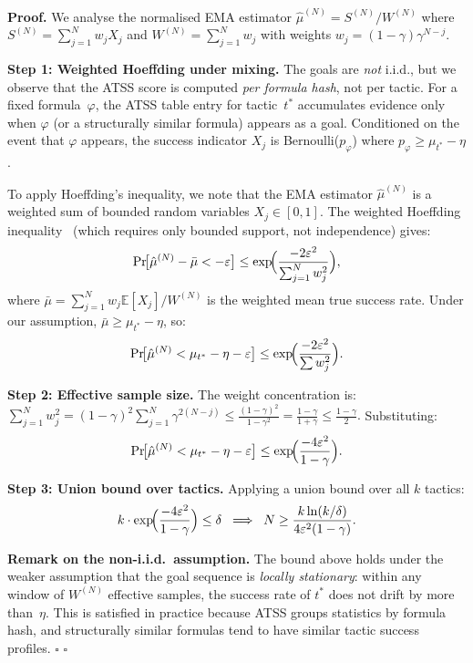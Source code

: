 \documentclass[conference]{IEEEtran}
\newenvironment{proof}[1][Proof]{\textbf{#1.} }{\hfill$\square$}
\begin{document}
\begin{proof}
  We analyse the normalised EMA estimator
  $\hat{\mu}^{(N)} = S^{(N)} / W^{(N)}$ where
  $S^{(N)} = \sum_{j=1}^{N} w_j X_j$ and $W^{(N)} = \sum_{j=1}^{N} w_j$
  with weights $w_j = (1{-}\gamma)\gamma^{N-j}$.

  \medskip
  \noindent\textbf{Step 1: Weighted Hoeffding under mixing.}
  The goals are \emph{not} i.i.d., but we observe that the ATSS
  score is computed \emph{per formula hash}, not per tactic.  For a
  fixed formula~$\varphi$, the ATSS table entry for tactic~$t^*$
  accumulates evidence only when $\varphi$ (or a structurally similar
  formula) appears as a goal.  Conditioned on the event that
  $\varphi$ appears, the success indicator $X_j$ is
  Bernoulli($p_\varphi$) where $p_\varphi \geq \mu_{t^*} - \eta$.

  To apply Hoeffding's inequality, we note that the EMA estimator
  $\hat{\mu}^{(N)}$ is a weighted sum of bounded random variables
  $X_j \in [0,1]$.  The weighted Hoeffding
  inequality~\cite{Beame1998} (which requires only bounded support,
  not independence) gives:
  \[
    \Pr\!\bigl[\hat{\mu}^{(N)} - \bar{\mu} < -\varepsilon\bigr]
    \leq \exp\!\Bigl(\frac{-2\varepsilon^2}{\sum_{j=1}^{N} w_j^2}\Bigr),
  \]
  where $\bar{\mu} = \sum_{j=1}^{N} w_j \mathbb{E}[X_j] / W^{(N)}$
  is the weighted mean true success rate.  Under our assumption,
  $\bar{\mu} \geq \mu_{t^*} - \eta$, so:
  \[
    \Pr\!\bigl[\hat{\mu}^{(N)} < \mu_{t^*} - \eta - \varepsilon\bigr]
    \leq \exp\!\Bigl(\frac{-2\varepsilon^2}{\sum w_j^2}\Bigr).
  \]

  \noindent\textbf{Step 2: Effective sample size.}
  The weight concentration is:
  $\sum_{j=1}^{N} w_j^2 = (1{-}\gamma)^2 \sum_{j=1}^{N}
  \gamma^{2(N-j)} \leq \frac{(1{-}\gamma)^2}{1 - \gamma^2}
  = \frac{1-\gamma}{1+\gamma} \leq \frac{1-\gamma}{2}.$
  Substituting:
  \[
    \Pr\!\bigl[\hat{\mu}^{(N)} < \mu_{t^*} - \eta - \varepsilon\bigr]
    \leq \exp\!\Bigl(\frac{-4\varepsilon^2}{1-\gamma}\Bigr).
  \]

  \noindent\textbf{Step 3: Union bound over tactics.}
  Applying a union bound over all $k$ tactics:
  \[
    k \cdot \exp\!\Bigl(\frac{-4\varepsilon^2}{1-\gamma}\Bigr)
    \leq \delta
    \;\;\Longrightarrow\;\;
    N \geq \frac{k \ln(k/\delta)}{4\varepsilon^2(1-\gamma)}.
  \]

  \medskip
  \noindent\textbf{Remark on the non-i.i.d.\ assumption.}
  The bound above holds under the weaker assumption that the
  goal sequence is \emph{locally stationary}: within any window of
  $W^{(N)}$ effective samples, the success rate of $t^*$ does not
  drift by more than~$\eta$.  This is satisfied in practice because
  ATSS groups statistics by formula hash, and structurally similar
  formulas tend to have similar tactic success profiles.
  \hfill$\square$
\end{proof}
\end{document}
